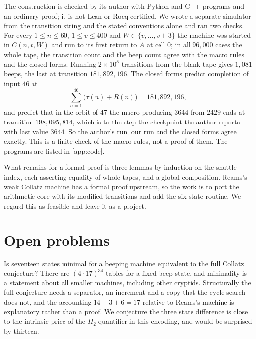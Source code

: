 The construction is checked by its author with Python and C++ programs and an ordinary proof; it is not Lean or Rocq certified. We wrote a separate simulator from the transition string and the stated conventions alone and ran two checks. For every $1\le n\le60$, $1\le v\le400$ and $W\in\{v,\dots,v+3\}$ the machine was started in $C(n,v,W)$ and run to its first return to $A$ at cell $0$; in all $96{,}000$ cases the whole tape, the transition count and the beep count agree with the macro rules and the closed forms. Running $2\times10^8$ transitions from the blank tape gives $1{,}081$ beeps, the last at transition $181{,}892{,}196$. The closed forms predict completion of input $46$ at
\[
\sum_{n=1}^{46}\bigl(\tau(n)+R(n)\bigr)=181{,}892{,}196,
\]
and predict that in the orbit of $47$ the macro producing $3644$ from $2429$ ends at transition $198{,}095{,}814$, which is to the step the checkpoint the author reports with last value $3644$. So the author's run, our run and the closed forms agree exactly. This is a finite check of the macro rules, not a proof of them. The programs are listed in \cref{app:code}.

What remains for a formal proof is three lemmas by induction on the shuttle index, each asserting equality of whole tapes, and a global composition. Reams's weak Collatz machine has a formal proof upstream, so the work is to port the arithmetic core with its modified transitions and add the six state routine. We regard this as feasible and leave it as a project.

\section{Open problems}\label{sec:ch21:open}

\begin{problem*}[Q1. Minimality]\label{prob:ch21:minimal}
Is seventeen states minimal for a beeping machine equivalent to the full Collatz conjecture? There are $(4\cdot17)^{34}$ tables for a fixed beep state, and minimality is a statement about all smaller machines, including other cryptids. Structurally the full conjecture needs a separator, an increment and a copy that the cycle search does not, and the accounting $14-3+6=17$ relative to Reams's machine is explanatory rather than a proof. We conjecture the three state difference is close to the intrinsic price of the $\Pi_2$ quantifier in this encoding, and would be surprised by thirteen.
\end{problem*}

